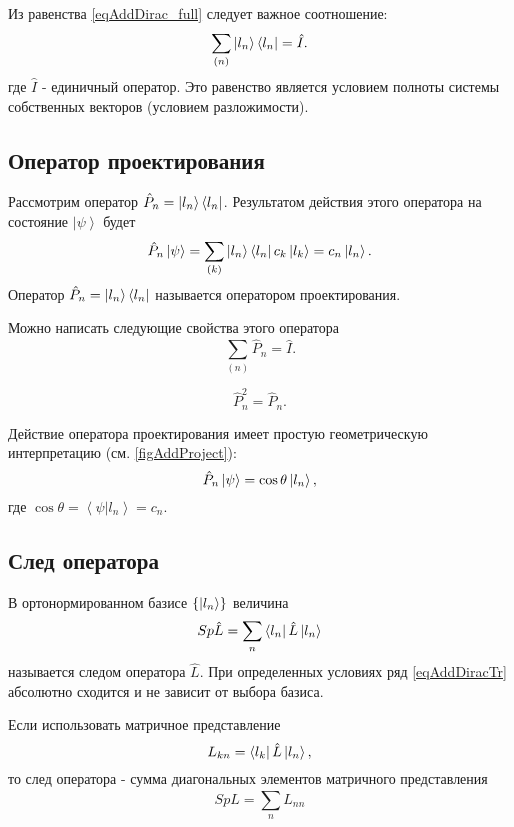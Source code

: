 Из равенства \ref{eqAddDirac_full} следует важное соотношение:
\begin{equation}  
\sum_{(n)} \ket{ l_n } \bra{ l_n } = \hat{I}.
\label{eqAddDiracI}
\end{equation}  
где $\hat{I}$ -  единичный оператор. Это равенство является условием
полноты системы собственных векторов (условием разложимости). 

\subsection{Оператор проектирования}
\label{AddDiracProjector}

Рассмотрим оператор \(\hat{P}_n = \ket{ l_n } \left< l_n
\right|\). 
Результатом действия этого оператора на состояние 
\(\left| \psi \right>\) будет
\begin{equation}
\hat{P}_n \left| \psi \right> = \sum_{(k)} \ket{ l_n } \left<
l_n \right| c_k \ket{ l_k } = c_n \ket{ l_n }.
\label{eqDiracProektor}
\end{equation}
Оператор \(\hat{P}_n = \ket{ l_n } \bra{ l_n }\) называется
оператором проектирования.

Можно написать следующие свойства этого оператора
\begin{equation}  
\sum_{(n)} \hat{P}_n = \hat{I}.
\end{equation}  

\begin{equation}  
\hat{P}_n^2 = \hat{P}_n.
\end{equation}  


Действие оператора проектирования имеет простую геометрическую
интерпретацию  (см. \autoref{figAddProject}):
\[
\hat{P}_n\left|\psi\right> = \cos{\theta} \ket{l_n},
\]
где $\cos{\theta} = \left<\psi|l_n\right> = c_n$. 

\subsection{След оператора}
\label{AddDiracTrace}
В ортонормированном базисе \(\left\{\ket{l_n}\right\}\) 
величина 
\begin{equation}  
Sp \hat{L} = \sum_n \bra{l_n} \hat{L} \ket{l_n}
\label{eqAddDiracTr}
\end{equation}  
называется следом оператора \(\hat{L}\). При определенных условиях
\cite{bTraceClassOperatorAdd1} ряд \ref{eqAddDiracTr}
абсолютно сходится и не зависит от выбора базиса.

Если использовать матричное представление 
\[
L_{kn} = \bra{l_k} \hat{L} \ket{l_n}, 
\]
то след оператора - сумма диагональных элементов матричного 
представления
\[
Sp \hat{L} = \sum_n L_{nn}
\]

